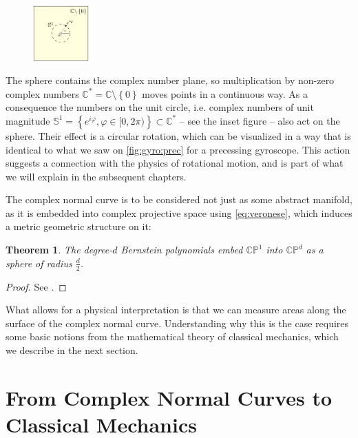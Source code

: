 \documentclass[12pt,final,3p]{elsarticle}
\newtheorem{theorem}{Theorem}
\begin{document}
\begingroup
\setlength{\columnsep}{6pt}
\setlength{\intextsep}{0pt}
\begin{figure}
	\includegraphics[width=0.19\textwidth, keepaspectratio]{figures/cylinder.pdf}
	\label{fig:cylinder}
\end{figure}
The sphere contains the complex number plane, so multiplication by non-zero complex numbers $\mathbb{C}^{\ast} = \mathbb{C} \setminus \left\lbrace 0\right\rbrace$ moves points in a continuous way. As a consequence the numbers on the unit circle, i.e. complex numbers of unit magnitude $\mathbb{S}^{1} = \left\lbrace e^{i\varphi}, \varphi \in [0,2\pi) \right\rbrace \subset \mathbb{C}^{\ast}$ -- see the inset figure -- also act on the sphere. Their effect is a circular rotation, which can be visualized in a way that is identical to what we saw on \autoref{fig:gyro:prec} for a precessing gyroscope. This action suggests a connection with the physics of rotational motion, and is part of what we will explain in the subsequent chapters.

\endgroup
The complex normal curve is to be considered not just as some abstract manifold, as it is embedded into complex projective space using \eqref{eq:veronese}, which induces a metric geometric structure on it:
\begin{theorem}\label{thm:round}
	The degree-$d$ Bernstein polynomials embed $\mathbb{CP}^{1}$ into $\mathbb{CP}^d $ as a sphere of radius $\frac{d}{2}$.
\end{theorem}
\begin{proof}
	See \cite[Ch. 6.3]{bengtsson2006geometry}.
\end{proof}
What allows for a physical interpretation is that we can measure areas along the surface of the complex normal curve. Understanding why this is the case requires some basic notions from the mathematical theory of classical mechanics, which we describe in the next section.

\section{From Complex Normal Curves to Classical Mechanics}\label{sec:classicalbasics}
\end{document}
